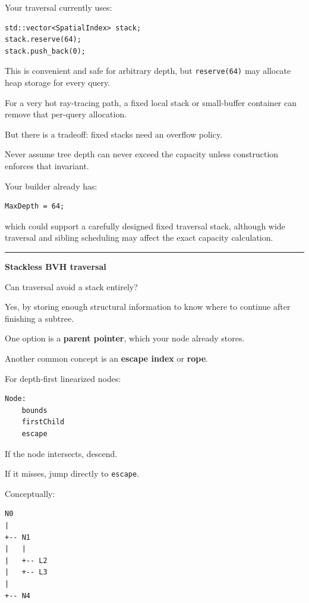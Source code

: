 Your traversal currently uses:

\begin{verbatim}
std::vector<SpatialIndex> stack;
stack.reserve(64);
stack.push_back(0);
\end{verbatim}

This is convenient and safe for arbitrary depth, but \texttt{reserve(64)} may allocate heap storage for every query.

For a very hot ray-tracing path, a fixed local stack or small-buffer container can remove that per-query allocation.

But there is a tradeoff: fixed stacks need an overflow policy.

Never assume tree depth can never exceed the capacity unless construction enforces that invariant.

Your builder already has:

\begin{verbatim}
MaxDepth = 64;
\end{verbatim}

which could support a carefully designed fixed traversal stack, although wide traversal and sibling scheduling may affect the exact capacity calculation.

\begin{center}\rule{0.5\linewidth}{0.5pt}\end{center}

\textbf{Stackless BVH traversal}

Can traversal avoid a stack entirely?

Yes, by storing enough structural information to know where to continue after finishing a subtree.

One option is a \textbf{parent pointer}, which your node already stores.

Another common concept is an \textbf{escape index} or \textbf{rope}.

For depth-first linearized nodes:

\begin{verbatim}
Node:
    bounds
    firstChild
    escape
\end{verbatim}

If the node intersects, descend.

If it misses, jump directly to \texttt{escape}.

Conceptually:

\begin{verbatim}
N0
|
+-- N1
|   |
|   +-- L2
|   +-- L3
|
+-- N4
\end{verbatim}

